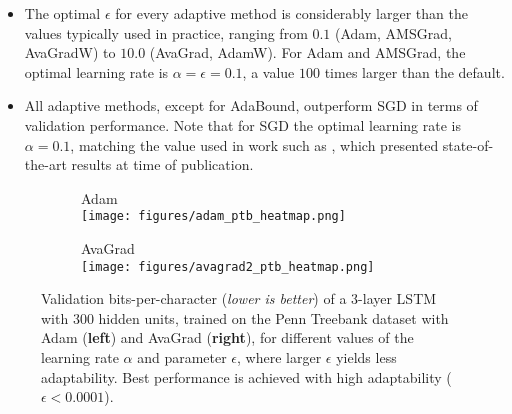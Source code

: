 \documentclass{article}
\begin{document}
\vspace{-5.0pt}
\begin{itemize}[leftmargin=0.2in]
   \item{
      The optimal $\epsilon$ for every adaptive method is considerably larger
      than the values typically used in practice, ranging from $0.1$ (Adam,
      AMSGrad, AvaGradW) to $10.0$ (AvaGrad, AdamW).  For Adam and AMSGrad, the
      optimal learning rate is $\alpha = \epsilon = 0.1$, a value $100$ times
      larger than the default.
   }
   \item{
      All adaptive methods, except for AdaBound, outperform SGD in terms of
      validation performance.  Note that for SGD the optimal learning rate is
      $\alpha = 0.1$, matching the value used in work such as
      \citet{resnet1, wide, resnext}, which presented state-of-the-art results
      at time of publication.
   }
\end{itemize}

\begin{figure*}[bt!]
   \centering
   \begin{subfigure}{.5\textwidth}
      \centering
      \scriptsize{\textsf{Adam}}\\
      \texttt{[image: figures/adam\_ptb\_heatmap.png]}
   \end{subfigure}\hfill
   \begin{subfigure}{.5\textwidth}
      \centering
      \scriptsize{\textsf{AvaGrad}}\\
      \texttt{[image: figures/avagrad2\_ptb\_heatmap.png]}
   \end{subfigure}
   \caption{
      Validation bits-per-character (\emph{lower is better}) of a 3-layer LSTM
      with 300 hidden units, trained on the Penn Treebank dataset with Adam (\textbf{left}) and AvaGrad (\textbf{right}), for
      different values of the learning rate $\alpha$ and
      parameter $\epsilon$, where larger $\epsilon$ yields less adaptability. Best performance is achieved with high adaptability ($\epsilon < 0.0001$).
   }
   \label{fig:rnns}
\end{figure*}
 
\end{document}
